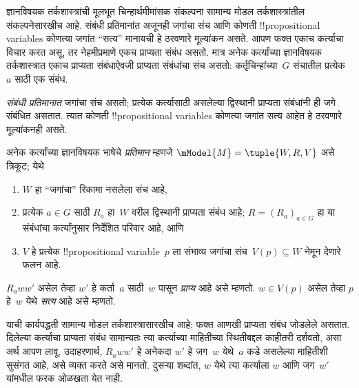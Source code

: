 \documentclass[../../../include/open-logic-section]{subfiles}
\begin{document}


ज्ञानविषयक तर्कशास्त्रांची मूलभूत चिन्हार्थमीमांसक
संकल्पना सामान्य मोडल तर्कशास्त्रांतील संकल्पनेसारखीच
आहे. संबंधी प्रतिमानांत अजूनही जगांचा संच आणि कोणती
!!{propositional
variable}s कोणत्या जगांत ``सत्य''
मानायची हे ठरवणारे मूल्यांकन असते. आपण फक्त एकाच
कर्त्याचा विचार करत असू, तर नेहमीप्रमाणे एकच
प्राप्यता संबंध असतो. मात्र अनेक कर्त्यांच्या ज्ञानविषयक
तर्कशास्त्रात एकाच प्राप्यता संबंधाऐवजी प्राप्यता
संबंधांचा संच असतो: कर्तृचिन्हांच्या~$G$ संचातील
प्रत्येक~$a$ साठी एक संबंध.

\emph{संबंधी प्रतिमानात} जगांचा संच असतो; प्रत्येक
कर्त्यासाठी असलेल्या द्विस्थानी प्राप्यता संबंधांनी
ही जगे संबंधित असतात. त्यात कोणती !!{propositional variable}s कोणत्या जगांत सत्य आहेत हे ठरवणारे
मूल्यांकनही असते.

\begin{defn}
  अनेक कर्त्यांच्या ज्ञानविषयक भाषेचे \emph{प्रतिमान}
  म्हणजे $\mModel{M} = \tuple{W, R, V}$ असे त्रिकूट;
  येथे
  \begin{enumerate}
  \item $W$ हा ``जगांचा'' रिकामा नसलेला संच आहे,
  \item प्रत्येक $a \in G$ साठी ${R}_a$ हा~$W$ वरील
  द्विस्थानी प्राप्यता संबंध आहे; $R=(R_a)_{a\in G}$
  हा या संबंधांचा कर्त्यांनुसार निर्देशित परिवार आहे, आणि
  \item $V$ हे प्रत्येक !!{propositional
    variable}~$p$ ला संभाव्य जगांचा संच~$V(p)\subseteq W$ नेमून
    देणारे फलन आहे.
  \end{enumerate}
  $R_a ww'$ असेल तेव्हा $w'$ हे कर्ता~$a$ साठी~$w$
  पासून \emph{प्राप्य} आहे असे म्हणतो. $w \in V(p)$
  असेल तेव्हा $p$ हे~$w$ येथे \emph{सत्य} आहे असे म्हणतो.
\end{defn}

याची कार्यपद्धती सामान्य मोडल तर्कशास्त्रासारखीच
आहे; फक्त आणखी प्राप्यता संबंध जोडलेले असतात.
दिलेल्या कर्त्याचा प्राप्यता संबंध सामान्यतः त्या
कर्त्याच्या माहितीच्या स्थितीबद्दल काहीतरी दर्शवतो,
असा अर्थ आपण लावू. उदाहरणार्थ, $R_a ww'$ हे
अनेकदा $w'$ हे जग~$w$ येथे~$a$ कडे असलेल्या
माहितीशी सुसंगत आहे, असे व्यक्त करते असे मानतो.
दुसऱ्या शब्दांत, $w$ येथे त्या कर्त्याला $w$ आणि
जग~$w'$ यांमधील फरक ओळखता येत नाही.
\end{document}
